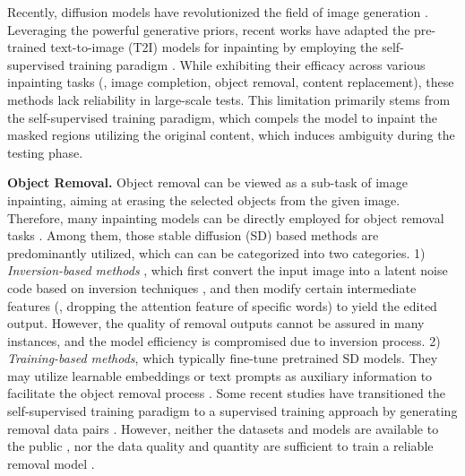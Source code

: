 \documentclass[10pt,twocolumn,letterpaper]{article}
\begin{document}
Recently, diffusion models have revolutionized the field of image generation \cite{ho2020denoising,song2020denoising,rombach2022high,podell2023sdxl,esser2024scaling,blattmann2023stable}. Leveraging the powerful generative priors, recent works have adapted the pre-trained text-to-image (T2I) models for inpainting by employing the self-supervised training paradigm \cite{lugmayr2022repaint,saharia2022palette,wang2023imagen,podell2023sdxl}.
While exhibiting their efficacy across various inpainting tasks (\eg, image completion, object removal, content replacement), these methods lack reliability in large-scale tests. This limitation primarily stems from the self-supervised training paradigm, which compels the model to inpaint the masked regions utilizing the original content, which induces ambiguity during the testing phase.

\noindent\textbf{Object Removal.} Object removal can be viewed as a sub-task of image inpainting, aiming at erasing the selected objects from the given image. Therefore, many inpainting models can be directly employed for object removal tasks \cite{suvorov2022resolution,ma2022regionwise,shamsolmoali2023transinpaint,zhou2023propainter,ko2023continuously}. Among them, those stable diffusion (SD) \cite{zhuang2023task,winter2024objectdrop,yildirim2023inst,sheynin2024emu} based methods are predominantly utilized, which can can be categorized into two categories. 1) \textit{Inversion-based methods} \cite{li2024source,jia2024designedit,mokady2022null,hertz2022prompt,han2024proxedit}, which first convert the input image into a latent noise code based on inversion techniques \cite{song2020denoising,li2024source,mokady2022null}, and then modify certain intermediate features (\eg, dropping the attention feature of specific words) to yield the edited output. However, the quality of removal outputs cannot be assured in many instances, and the model efficiency is compromised due to inversion process. 2) \textit{Training-based methods}, which typically fine-tune pretrained SD models. They may utilize learnable embeddings or text prompts as auxiliary information to facilitate the object removal process \cite{zhuang2023task,brooks2023instructpix2pix,sheynin2024emu,geng2024instructdiffusion,zhang2024hive}. Some recent studies have transitioned the self-supervised training paradigm to a supervised training approach by generating removal data pairs \cite{yildirim2023inst,winter2024objectdrop,sheynin2024emu,sagong2022rord}. However, neither the datasets and models are available to the public \cite{winter2024objectdrop,sheynin2024emu,zhang2024hive}, nor the data quality and quantity are sufficient to train a reliable removal model \cite{yildirim2023inst,tudosiu2024mulan,mahfoudi2019defacto}.
\end{document}
